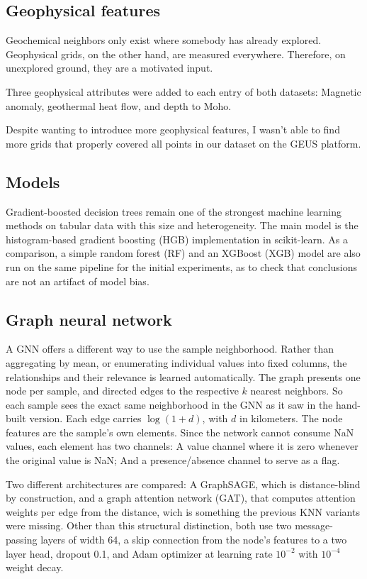 \documentclass[
    a4paper,
    11pt,
    oneside,
    numbers=noendperiod,
    abstract=true
]{scrartcl}
\begin{document}
\subsection{Geophysical features}
\label{sec:geophysics}
Geochemical neighbors only exist where somebody has already explored. Geophysical grids, on the other hand, are measured everywhere. Therefore, on unexplored ground, they are a motivated input.

Three geophysical attributes were added to each entry of both datasets: Magnetic anomaly, geothermal heat flow, and depth to Moho.

Despite wanting to introduce more geophysical features, I wasn't able to find more grids that properly covered all points in our dataset on the GEUS platform.

\subsection{Models}
\label{sec:models}

Gradient-boosted decision trees remain one of the strongest machine learning methods on tabular data with this size and heterogeneity. The main model is the histogram-based gradient boosting (HGB) implementation in scikit-learn. As a comparison, a simple random forest (RF) and an XGBoost (XGB) model are also run on the same pipeline for the initial experiments, as to check that conclusions are not an artifact of model bias.

\subsection{Graph neural network}
\label{sec:gnnmethod}

A GNN offers a different way to use the sample neighborhood. Rather than aggregating by mean, or enumerating individual values into fixed columns, the relationships and their relevance is learned automatically. 
The graph presents one node per sample, and directed edges to the respective $k$ nearest neighbors. 
So each sample sees the exact same neighborhood in the GNN as it saw in the hand-built version. 
Each edge carries $\log(1+d)$, with $d$ in kilometers. 
The node features are the sample's own elements. 
Since the network cannot consume NaN values, each element has two channels: A value channel where it is zero whenever the original value is NaN; And a presence/absence channel to serve as a flag.

Two different architectures are compared: A GraphSAGE, which is distance-blind by construction, and a graph attention network (GAT), that computes attention weights per edge from the distance, wich is something the previous KNN variants were missing. Other than this structural distinction, both use two message-passing layers of width 64, a skip connection from the node's features to a two layer head, dropout \num{0.1}, and Adam optimizer at learning rate $10^{-2}$ with $10^{-4}$ weight decay. 
\end{document}
